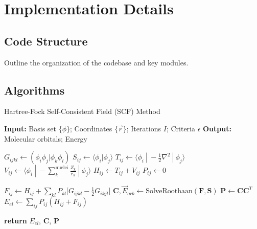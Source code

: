 \documentclass[12pt]{article}
\begin{document}
\section{Implementation Details}

\subsection{Code Structure}
Outline the organization of the codebase and key modules.

\subsection{Algorithms}

\begin{algorithm}
    \caption{Hartree-Fock Self-Consistent Field (SCF) Method}
    \begin{algorithmic}[1]
    
        \Statex \textbf{Input:} Basis set $\{\phi\}$; Coordinates $\{\vec{r}\}$; Iterations $I$; Criteria $\epsilon$
        \Statex \textbf{Output:} Molecular orbitals; Energy
        
        \State $G_{ijkl} \gets (\phi_i\phi_j|\phi_k\phi_l)$ 
        \State $S_{ij} \gets \langle \phi_i | \phi_j \rangle$ 
        \State $T_{ij} \gets \langle \phi_i \: | \: -\frac{1}{2}\nabla^2 \: |\: \phi_j \rangle$ 
        \State $V_{ij} \gets \langle \phi_i \: | \: -\sum_k^{\text{nuclei}} \frac{Z_k}{r_k} \: | \: \phi_j \rangle$ 
        \State $H_{ij} \gets T_{ij} + V_{ij}$ 
        \State $P_{ij} \gets 0$ 
        
            \State $F_{ij} \gets H_{ij} + \sum_{kl} P_{kl} \Big[ G_{ijkl} - \frac{1}{2} G_{ikjl} \Big]$ 
            \State $\mathbf{C}, \vec{E}_{orb} \gets \text{SolveRoothaan} (\mathbf{F}, \mathbf{S})$  
            \State $\mathbf{P} \gets \mathbf{C}\mathbf{C}^T$ 
            \State $E_{el} \gets \sum_{ij} P_{ij} (H_{ij} + F_{ij})$ 
        \EndWhile

        \State \textbf{return} $E_{el}$, $\mathbf{C}$, $\mathbf{P}$
    
    \end{algorithmic}
\end{algorithm}
\end{document}
